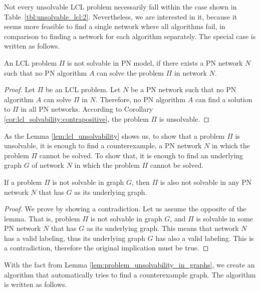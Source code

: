 Not every unsolvable LCL problem necessarily fall within the case shown in Table~\ref{tbl:unsolvable_lcl:2}.
Nevertheless, we are interested in it, because it seems more feasible to find a single network where all algorithms fail, in comparison to finding a network for each algorithm separately.
The special case is written as follows.

\begin{lemma} \label{lem:lcl_unsolvability}
    An LCL problem $\Pi$ is not solvable in PN model, if there exists a PN network $N$ such that no PN algorithm $A$ can solve the problem $\Pi$ in network $N$.
\end{lemma}
\begin{proof}
    Let $\Pi$ be an LCL problem.
    Let $N$ be a PN network such that no PN algorithm $A$ can solve $\Pi$ in $N$.
    Therefore, no PN algorithm $A$ can find a solution to $\Pi$ in all PN networks.
    According to Corollary \ref{cor:lcl_solvability:contrapositive}, the problem $\Pi$ is unsolvable.
\end{proof}

As the Lemma \ref{lem:lcl_unsolvability} shows us, to show that a problem $\Pi$ is unsolvable, it is enough to find a counterexample, a PN network $N$ in which the problem $\Pi$ cannot be solved.
To show that, it is enough to find an underlying graph $G$ of network $N$ in which the problem $\Pi$ cannot be solved.

\begin{lemma} \label{lem:problem_unsolvability_in_graphs}
    If a problem $\Pi$ is not solvable in graph $G$, then $\Pi$ is also not solvable in any PN network $N$ that has $G$ as its underlying graph.
\end{lemma}
\begin{proof}
    We prove by showing a contradiction.
    Let us assume the opposite of the lemma.
    That is, problem $\Pi$ is not solvable in graph $G$, and $\Pi$ is solvable in some PN network $N$ that has $G$ as its underlying graph.
    This means that network $N$ has a valid labeling, thus its underlying graph $G$ has also a valid labeling.
    This is a contradiction, therefore the original implication must be true.
\end{proof}

With the fact from Lemma \ref{lem:problem_unsolvability_in_graphs}, we create an algorithm that automatically tries to find a counterexample graph.
The algorithm is written as follows.

